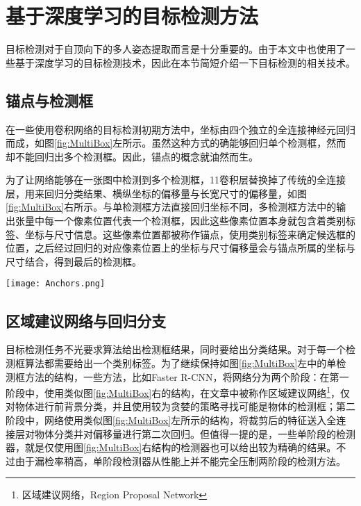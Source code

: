 \section{基于深度学习的目标检测方法}
\label{sec:factsobjectdetection}
目标检测对于自顶向下的多人姿态提取而言是十分重要的。由于本文中也使用了一些基于深度学习的目标检测技术，因此在本节简短介绍一下目标检测的相关技术。

\subsection{锚点与检测框}
\label{subsec:factsanchors}
在一些使用卷积网络的目标检测初期方法中，坐标由四个独立的全连接神经元回归而成，如图\ref{fig:MultiBox}左所示。虽然这种方式的确能够回归单个检测框，然而却不能回归出多个检测框。因此，锚点的概念就油然而生。

为了让网络能够在一张图中检测到多个检测框，1\times1卷积层替换掉了传统的全连接层，用来回归分类结果、横纵坐标的偏移量与长宽尺寸的偏移量，如图\ref{fig:MultiBox}右所示。与单检测框方法直接回归坐标不同，多检测框方法中的输出张量中每一个像素位置代表一个检测框，因此这些像素位置本身就包含着类别标签、坐标与尺寸信息。这些像素位置都被称作锚点，使用类别标签来确定候选框的位置，之后经过回归的对应像素位置上的坐标与尺寸偏移量会与锚点所属的坐标与尺寸结合，得到最后的检测框。

\begin{figure*}[htbp]	
	\centering
	\texttt{[image: Anchors.png]}
	\caption{基于卷积神经网络的单检测框(左)与多检测框(右)方法}
	\label{fig:MultiBox}
\end{figure*}

\subsection{区域建议网络与回归分支}
\label{subsec:factsRPNregression}
目标检测任务不光要求算法给出检测框结果，同时要给出分类结果。对于每一个检测框算法都需要给出一个类别标签。为了继续保持如图\ref{fig:MultiBox}左中的单检测框方法的结构，一些方法，比如Faster R-CNN\cite{Ren2015Faster}，将网络分为两个阶段：在第一阶段中，使用类似图\ref{fig:MultiBox}右的结构，在文章中被称作区域建议网络\footnote{区域建议网络，Region Proposal Network}，仅对物体进行前背景分类，并且使用较为贪婪的策略寻找可能是物体的检测框；第二阶段中，网络使用类似图\ref{fig:MultiBox}左所示的结构，将裁剪后的特征送入全连接层对物体分类并对偏移量进行第二次回归。但值得一提的是，一些单阶段的检测器，就是仅使用图\ref{fig:MultiBox}右结构的检测器也可以给出较为精确的结果。不过由于漏检率稍高，单阶段检测器从性能上并不能完全压制两阶段的检测方法。

